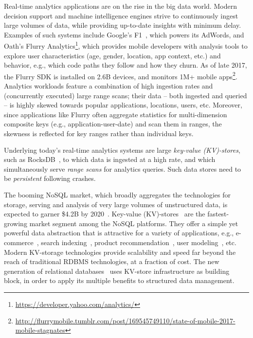 
Real-time analytics applications are on the rise in the big data world. 
Modern decision support and machine intelligence engines strive to continuously ingest large volumes of data, while providing up-to-date insights with minimum delay. 
Examples of such systems include Google's F1~\cite{Shute2013}, which powers its AdWords, and 
Oath's Flurry Analytics\footnote{\url{https://developer.yahoo.com/analytics/}}, which 
provides mobile developers with analysis tools to explore user characteristics (age, gender, location, app context, etc.) and behavior, e.g., which code paths they follow and how they churn.
As of late 2017, the Flurry SDK is installed on 2.6B devices, and monitors 1M+ mobile apps\footnote{\url{http://flurrymobile.tumblr.com/post/169545749110/state-of-mobile-2017-mobile-stagnates}}. 
Analytics workloads feature a combination of high ingestion rates and (concurrently executed) large range scans; their  
data -- both ingested and queried -- is highly skewed towards popular applications, locations, users, etc. 
Moreover, since applications like Flurry often aggregate statistics for multi-dimension composite keys (e.g., application-user-date)  
and scan them in ranges, the skewness is reflected for key ranges rather than individual keys. 

Underlying today's real-time analytics systems are large \emph{key-value (KV)-stores}, such as RocksDB~\cite{rocks},  
to which data is ingested at a high rate, and which simultaneously serve 
\emph{range scans} for analytics queries. Such data stores need to be \emph{persistent} following crashes.   


The booming NoSQL market, which broadly aggregates the technologies for storage, serving and analysis of very large volumes of unstructured data, is expected to garner \$4.2B by 2020~\cite{alliedmarketresearch}. %
Key-value (KV)-stores~\cite{Aerospike, Bigtable, Cassandra, DynamoDB, HBase, Redis, RocksDB, Scylla} are the fastest-growing market segment among the NoSQL platforms. They offer a simple yet powerful data abstraction that is  attractive for a variety of applications, e.g., e-commerce~\cite{DynamoDB}, search indexing~\cite{Percolator}, product recommendation~\cite{NetflixCassandraSpark}, user modeling~\cite{AirbnbHBase}, etc. Modern KV-storage technologies provide scalability and speed far beyond the reach of traditional RDBMS technologies, at a fraction of cost. The new generation of relational databases~\cite{MyRocks, Phoenix} uses KV-store infrastructure as building block, in order to apply its multiple benefits to structured data management. 





